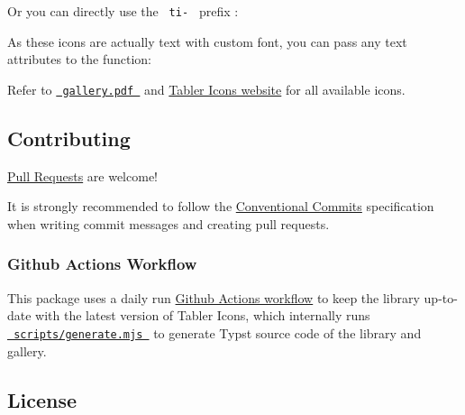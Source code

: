 Or you can directly use the \texttt{\ ti-\ } prefix :

\begin{Shaded}
\begin{Highlighting}[]
\end{Highlighting}
\end{Shaded}

As these icons are actually text with custom font, you can pass any text
attributes to the function:

\begin{Shaded}
\begin{Highlighting}[]
\end{Highlighting}
\end{Shaded}

Refer to
\href{https://github.com/zyf722/typst-tabler-icons/tree/main/gallery/gallery.pdf}{\texttt{\ gallery.pdf\ }}
and \href{https://tabler.io/icons}{Tabler Icons website} for all
available icons.

\subsection{Contributing}\label{contributing}

\href{https://github.com/zyf722/typst-tabler-icons/pulls}{Pull Requests}
are welcome!

It is strongly recommended to follow the
\href{https://www.conventionalcommits.org/en/v1.0.0/}{Conventional
Commits} specification when writing commit messages and creating pull
requests.

\subsubsection{Github Actions Workflow}\label{github-actions-workflow}

This package uses a daily run
\href{https://github.com/zyf722/typst-tabler-icons/tree/main/.github/workflows/build.yml}{Github
Actions workflow} to keep the library up-to-date with the latest version
of Tabler Icons, which internally runs
\href{https://github.com/zyf722/typst-tabler-icons/tree/main/scripts/generate.mjs}{\texttt{\ scripts/generate.mjs\ }}
to generate Typst source code of the library and gallery.

\subsection{License}\label{license}

